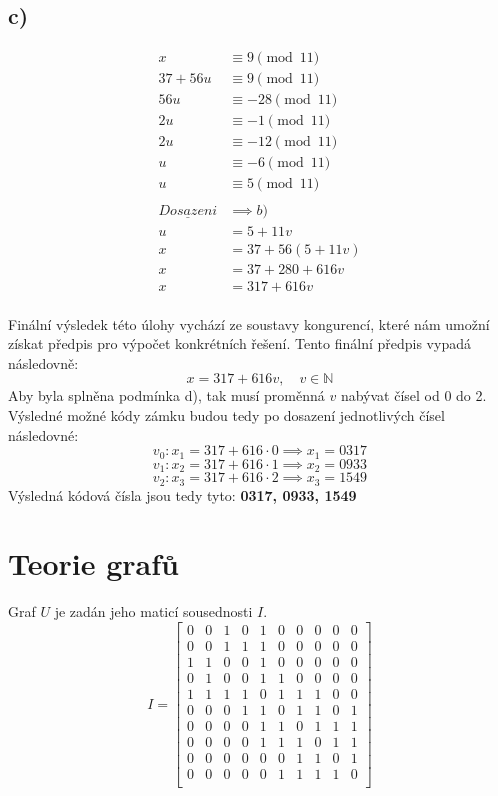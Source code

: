 \documentclass[a4paper, 10pt, oneside]{article}       %
\begin{document}
\begin{multicols}{3}
\section*{c)}
\begin{align*}
    x &\equiv 9\pmod{11}         \\
    37 + 56u &\equiv 9\pmod{11}  \\
    56u &\equiv -28\pmod{11}     \\
    2u &\equiv -1\pmod{11}       \\
    2u &\equiv -12\pmod{11}      \\
    u &\equiv -6\pmod{11}        \\
    u &\equiv 5\pmod{11}         \\
                                 \\
    \underline{Dosazeni} &\implies b) \\
    u &= 5 + 11v                 \\
    x &= 37 + 56 ( 5 + 11v )     \\
    x &= 37 + 280 +  616v        \\
    x &= 317 + 616v              \\
\end{align*}
\end{multicols}

Finální výsledek této úlohy vychází ze soustavy kongurencí, které nám umožní získat předpis pro výpočet konkrétních řešení. Tento finální předpis vypadá následovně:
$$ x = 317 + 616v,\quad v\in\mathbb{N} $$
\newpage
Aby byla splněna podmínka d), tak musí proměnná $v$ nabývat čísel od 0 do 2. Výsledné možné kódy zámku budou tedy po dosazení jednotlivých čísel následovné:
$$ v_0:  x_1 = 317 + 616 \cdot 0 \implies x_1 = 0317$$
$$ v_1:  x_2 = 317 + 616 \cdot 1 \implies x_2 = 0933$$
$$ v_2:  x_3 = 317 + 616 \cdot 2 \implies x_3 = 1549$$
\newline
Výsledná kódová čísla jsou tedy tyto: \textbf{0317, 0933, 1549}



\section{Teorie grafů}\label{sec:sec_2}

Graf $U$ je zadán jeho maticí sousednosti $I$.
\[ I = \begin{bmatrix}
0 & 0 & 1 & 0 & 1 & 0 & 0 & 0 & 0 & 0 \\
0 & 0 & 1 & 1 & 1 & 0 & 0 & 0 & 0 & 0 \\
1 & 1 & 0 & 0 & 1 & 0 & 0 & 0 & 0 & 0 \\
0 & 1 & 0 & 0 & 1 & 1 & 0 & 0 & 0 & 0 \\
1 & 1 & 1 & 1 & 0 & 1 & 1 & 1 & 0 & 0 \\
0 & 0 & 0 & 1 & 1 & 0 & 1 & 1 & 0 & 1 \\
0 & 0 & 0 & 0 & 1 & 1 & 0 & 1 & 1 & 1 \\
0 & 0 & 0 & 0 & 1 & 1 & 1 & 0 & 1 & 1 \\
0 & 0 & 0 & 0 & 0 & 0 & 1 & 1 & 0 & 1 \\
0 & 0 & 0 & 0 & 0 & 1 & 1 & 1 & 1 & 0 \\
\end{bmatrix} \]
\end{document}
